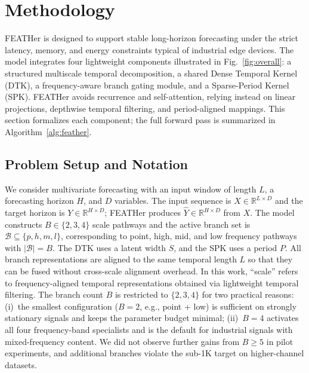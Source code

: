 \documentclass[journal]{IEEEtran}
\theoremstyle{remark}
\begin{document}
\section{Methodology}
\label{sec:method}

FEATHer is designed to support stable long-horizon forecasting under
the strict latency, memory, and energy constraints typical of
industrial edge devices. The model integrates four lightweight
components illustrated in Fig.~\ref{fig:overall}: a structured
multiscale temporal decomposition, a shared Dense Temporal Kernel
(DTK), a frequency-aware branch gating module, and a Sparse-Period
Kernel (SPK). FEATHer avoids recurrence and self-attention, relying
instead on linear projections, depthwise temporal filtering, and
period-aligned mappings. This section formalizes each component;
the full forward pass is summarized in
Algorithm~\ref{alg:feather}.

\subsection{Problem Setup and Notation}
We consider multivariate forecasting with an input window of length
$L$, a forecasting horizon $H$, and $D$ variables. The input sequence
is $X \in \mathbb{R}^{L \times D}$ and the target horizon is
$Y \in \mathbb{R}^{H \times D}$; FEATHer produces
$\widehat{Y} \in \mathbb{R}^{H \times D}$ from $X$. The model
constructs $B \in \{2,3,4\}$ scale pathways and the active branch
set is $\mathcal{B} \subseteq \{p,h,m,l\}$, corresponding to point,
high, mid, and low frequency pathways with $|\mathcal{B}| = B$. The
DTK uses a latent width $S$, and the SPK uses a period $P$. All
branch representations are aligned to the same temporal length $L$
so that they can be fused without cross-scale alignment overhead.
In this work, ``scale'' refers to frequency-aligned temporal
representations obtained via lightweight temporal filtering.
The branch count $B$ is restricted to $\{2,3,4\}$ for two
practical reasons: (i)~the smallest configuration ($B{=}2$, e.g.,
point + low) is sufficient on strongly stationary signals and keeps
the parameter budget minimal; (ii)~$B{=}4$ activates all four
frequency-band specialists and is the default for industrial signals
with mixed-frequency content. We did not observe further gains from
$B \ge 5$ in pilot experiments, and additional branches violate
the sub-1K target on higher-channel datasets.
\end{document}

